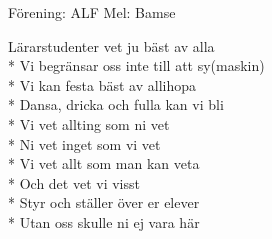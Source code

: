 \begin{SongText}
    \begin{SongInfo}
        Förening: ALF
        Mel: Bamse
    \end{SongInfo}
    \begin{Verse}
        Lärarstudenter vet ju bäst av alla\\*%
        Vi begränsar oss inte till att sy(maskin)\\*%
        Vi kan festa bäst av allihopa\\*%
        Dansa, dricka och fulla kan vi bli\\*%
        Vi vet allting som ni vet\\*%
        Ni vet inget som vi vet\\*%
        Vi vet allt som man kan veta\\*%
        Och det vet vi visst\\*%
        Styr och ställer över er elever\\*%
        Utan oss skulle ni ej vara här
    \end{Verse}
\end{SongText}

